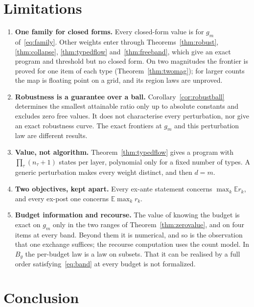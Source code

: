 \section{Limitations}
\label{sec:limits}

\begin{enumerate}
\item[1)] \textbf{One family for closed forms.} Every closed-form value is for $g_{m}$
of~\eqref{eq:family}. Other weights enter through Theorems~\ref{thm:robust},
\ref{thm:collapse}, \ref{thm:typedflow} and~\ref{thm:freeband}, which give an exact program
and threshold but no closed form. On two magnitudes the frontier is proved for one item of each
type (Theorem~\ref{thm:twomag}); for larger counts the map is floating point on a grid, and its
region laws are unproved.
\item[2)] \textbf{Robustness is a guarantee over a ball.} Corollary~\ref{cor:robustball}
determines the smallest attainable ratio only up to absolute constants and excludes zero
free values. It does not characterise every perturbation, nor give an exact robustness curve.
The exact frontiers at $g_m$ and this perturbation law are different results.
\item[3)] \textbf{Value, not algorithm.} Theorem~\ref{thm:typedflow} gives a program with
$\prod_\tau(n_\tau+1)$ states per layer, polynomial only for a fixed number of types. A generic
perturbation makes every weight distinct, and then $d=m$.
\item[4)] \textbf{Two objectives, kept apart.} Every ex-ante statement concerns
$\max_{k}\mathbb{E}r_{k}$, and every ex-post one concerns $\mathbb{E}\max_{k}r_{k}$.
\item[5)] \textbf{Budget information and recourse.} The value of knowing the budget is exact on
$g_m$ only in the two ranges of Theorem~\ref{thm:zerovalue}, and on four items at every band.
Beyond them it is numerical, and so is the observation that one exchange suffices; the recourse
computation uses the count model. In $B_g$ the per-budget law is a law on subsets. That it can be
realised by a full order satisfying~\eqref{eq:band} at every budget is not formalized.
\end{enumerate}

\section{Conclusion}

